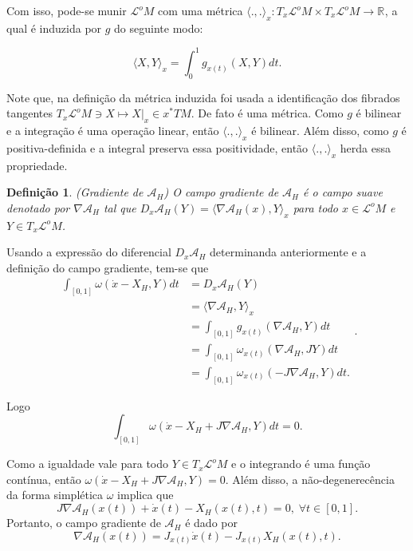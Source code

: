 \documentclass[12pt]{book}
\newtheorem{definicao}[teorema]{Definição}
\newcommand{\campohamiltoniano}[1]{X_{H}(#1)}
\newcommand{\campohamiltonianoabrev}{X_{H}}
\newcommand{\espacotangenteponto}[2]{T_{#1}#2}
\newcommand{\funcionalH}{\mathcal{A}_{H}}
\newcommand{\gradientefuncional}{\nabla \funcionalH}
\newcommand{\iprod}[2]{\langle #1, #2 \rangle}
\newcommand{\intervalo}{[0,1]}
\newcommand{\produtointerno}[2]{\langle #1, #2 \rangle}
\newcommand{\pullbackfibradotangente}[2]{#1^{*}T#2}
\newcommand{\real}[1]{\mathbb{R}^{#1}}
\newcommand{\reta}{\real{}}
\newcommand{\lacocontrateis}{\mathcal{L}^{o}M}
\begin{document}
	Com isso, pode-se munir $\lacocontrateis$ com uma métrica $\produtointerno{.}{.}_{x}: \espacotangenteponto{x}{\lacocontrateis} \times \espacotangenteponto{x}{\lacocontrateis} \to \reta$, a qual é induzida por $g$ do seguinte modo:
	
	$$
	\produtointerno{X}{Y}_{x} = \int_{0}^{1}g_{x(t)}(X, Y)dt.
	$$
	
	Note que, na definição da métrica induzida foi usada a identificação dos fibrados tangentes $\espacotangenteponto{x}{\lacocontrateis} \ni X \mapsto  X|_{x} \in \pullbackfibradotangente{x}{M}$. De fato é uma métrica. Como $g$ é bilinear e a integração é uma operação linear, então $\produtointerno{.}{.}_{x}$ é bilinear. Além disso, como $g$ é positiva-definida e a integral preserva essa positividade, então $\produtointerno{.}{.}_{x}$ herda essa propriedade.
	
	\begin{definicao}
		(Gradiente de $\funcionalH$) O campo gradiente de $\funcionalH$ é o campo suave denotado por $\gradientefuncional$ tal que $D_{x}\funcionalH(Y) = \produtointerno{\gradientefuncional(x)}{Y}_{x}$ para todo $x \in \lacocontrateis$ e $Y \in \espacotangenteponto{x}{\lacocontrateis}$.
	\end{definicao}
	
	Usando a expressão do diferencial $D_{x}\funcionalH$ determinanda anteriormente e a definição do campo gradiente, tem-se que
	$$
	\begin{aligned}
	\int_{[0,1]} \omega(\dot{x} - \campohamiltonianoabrev, Y)dt&=
	D_{x}\funcionalH(Y)
	\\ 
	&= \iprod{\gradientefuncional}{Y}_{x}
	\\
	&= \int_{[0,1]}g_{x(t)}(\gradientefuncional, Y)dt
	\\
	&=\int_{[0,1]} \omega_{x(t)}(\gradientefuncional, JY)dt
	\\
	&=\int_{[0,1]} \omega_{x(t)}(-J\gradientefuncional, Y)dt.
	\end{aligned}.
	$$
	
	Logo
	$$
	\int_{[0,1]} \omega(\dot{x} - \campohamiltonianoabrev + J\gradientefuncional, Y)dt = 0.
	$$
	
	Como a igualdade vale para todo $Y \in \espacotangenteponto{x}{\lacocontrateis}$ e o integrando é uma função contínua, então $\omega(\dot{x} - \campohamiltonianoabrev + J\gradientefuncional, Y)=0$. Além disso, a não-degenerecência da forma simplética $\omega$ implica que
	$$
	J\gradientefuncional(x(t)) +\dot{x}(t)-\campohamiltoniano{x(t), t} = 0, \; \forall t \in \intervalo.
	$$
	Portanto, o campo gradiente de $\funcionalH$ é dado por
	$$
	\gradientefuncional(x(t))= J_{x(t)}\dot{x}(t)-J_{x(t)}\campohamiltoniano{x(t), t}.
	$$
	
\end{document}
